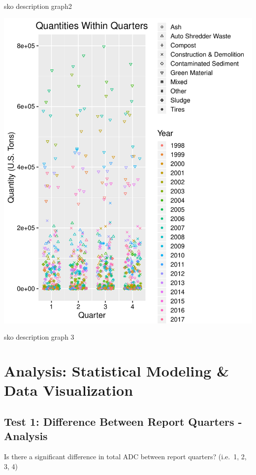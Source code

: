 \documentclass[12pt,]{article}
\newenvironment{Shaded}{\begin{snugshade}}{\end{snugshade}}
\newcommand{\KeywordTok}[1]{\textcolor[rgb]{0.13,0.29,0.53}{\textbf{#1}}}
\newcommand{\StringTok}[1]{\textcolor[rgb]{0.31,0.60,0.02}{#1}}
\newcommand{\CommentTok}[1]{\textcolor[rgb]{0.56,0.35,0.01}{\textit{#1}}}
\newcommand{\OperatorTok}[1]{\textcolor[rgb]{0.81,0.36,0.00}{\textbf{#1}}}
\newcommand{\NormalTok}[1]{#1}
\begin{document}
sko description graph2

\includegraphics{SKo_Project_Template_files/figure-latex/explore_graphs4-1.pdf}

sko description graph 3

\newpage

\section{Analysis: Statistical Modeling \& Data
Visualization}\label{analysis-statistical-modeling-data-visualization}

\subsection{Test 1: Difference Between Report Quarters -
Analysis}\label{test-1-difference-between-report-quarters---analysis}

Is there a significant difference in total ADC between report quarters?
(i.e.~1, 2, 3, 4)

\begin{Shaded}
\end{Shaded}
\end{document}
